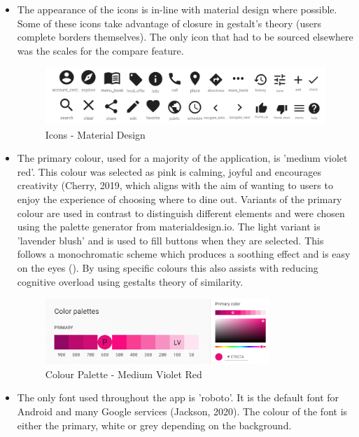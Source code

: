 \documentclass[a4 paper, 12pt]{article}
\begin{document}
    \begin{itemize}
        \item The appearance of the icons is in-line with material design where possible. Some of these icons take advantage of closure in gestalt's theory (users complete borders themselves). The only icon that had to be sourced elsewhere was the scales for the compare feature.        
            \begin{figure} [H]
                \centering
                \includegraphics[width=\textwidth, frame]
                    {./images/material_icons.PNG}
                \caption{Icons - Material Design}
            \end{figure}                 
        \item The primary colour, used for a majority of the application, is 'medium violet red'. This colour was selected as pink is calming, joyful and encourages creativity (Cherry, 2019, which aligns with the aim of wanting to users to enjoy the experience of choosing where to dine out. Variants of the primary colour are used in contrast to distinguish different elements and were chosen using the palette generator from materialdesign.io. The light variant is 'lavender blush' and is used to fill buttons when they are selected. This follows a monochromatic scheme which produces a soothing effect and is easy on the eyes (). By using specific colours this also assists with reducing cognitive overload using gestalts theory of similarity.
            \begin{figure} [H]
                \centering
                \includegraphics[width=0.8\textwidth, frame]
                    {./images/colour_med.PNG}
                \caption{Colour Palette - Medium Violet Red}
            \end{figure}
        \item The only font used throughout the app is 'roboto'. It is the default font for Android and many Google services (Jackson, 2020). The colour of the font is either the primary, white or grey depending on the background.

\end{itemize}
\end{document}
